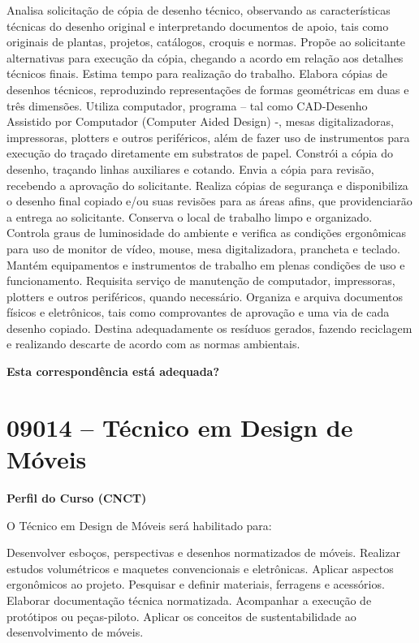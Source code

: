 \documentclass[
]{article}
\begin{document}
Analisa solicitação de cópia de desenho técnico, observando as
características técnicas do desenho original e interpretando documentos
de apoio, tais como originais de plantas, projetos, catálogos, croquis e
normas. Propõe ao solicitante alternativas para execução da cópia,
chegando a acordo em relação aos detalhes técnicos finais. Estima tempo
para realização do trabalho. Elabora cópias de desenhos técnicos,
reproduzindo representações de formas geométricas em duas e três
dimensões. Utiliza computador, programa -- tal como CAD-Desenho
Assistido por Computador (Computer Aided Design) -, mesas
digitalizadoras, impressoras, plotters e outros periféricos, além de
fazer uso de instrumentos para execução do traçado diretamente em
substratos de papel. Constrói a cópia do desenho, traçando linhas
auxiliares e cotando. Envia a cópia para revisão, recebendo a aprovação
do solicitante. Realiza cópias de segurança e disponibiliza o desenho
final copiado e/ou suas revisões para as áreas afins, que providenciarão
a entrega ao solicitante. Conserva o local de trabalho limpo e
organizado. Controla graus de luminosidade do ambiente e verifica as
condições ergonômicas para uso de monitor de vídeo, mouse, mesa
digitalizadora, prancheta e teclado. Mantém equipamentos e instrumentos
de trabalho em plenas condições de uso e funcionamento. Requisita
serviço de manutenção de computador, impressoras, plotters e outros
periféricos, quando necessário. Organiza e arquiva documentos físicos e
eletrônicos, tais como comprovantes de aprovação e uma via de cada
desenho copiado. Destina adequadamente os resíduos gerados, fazendo
reciclagem e realizando descarte de acordo com as normas ambientais.

\begin{Form}
\textbf{Esta correspondência está adequada?} \\ 
\end{Form}

\newpage
\section{ 09014 -- Técnico em Design de Móveis }

\textbf{Perfil do Curso (CNCT)}

O Técnico em Design de Móveis será habilitado para:

Desenvolver esboços, perspectivas e desenhos normatizados de móveis.
Realizar estudos volumétricos e maquetes convencionais e eletrônicas.
Aplicar aspectos ergonômicos ao projeto. Pesquisar e definir materiais,
ferragens e acessórios. Elaborar documentação técnica normatizada.
Acompanhar a execução de protótipos ou peças-piloto. Aplicar os
conceitos de sustentabilidade ao desenvolvimento de móveis.
\end{document}
